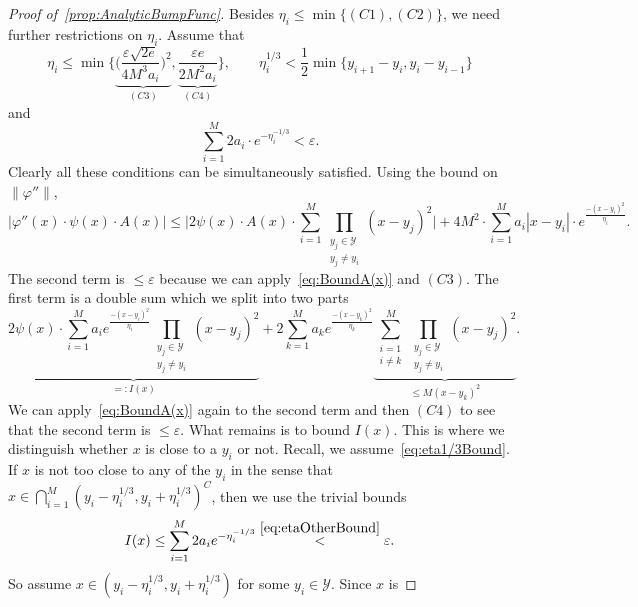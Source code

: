 \documentclass[12pt,]{article}
\def\cref#1{\ref{#1}}%
\theoremstyle{definition}
\theoremstyle{remark}
\newcommand{\0}{\mathbf{0}}
\begin{document}
{\begin{proof}[Proof of~\cref{prop:AnalyticBumpFunc}]
Besides $\eta_i\leq\min\{(C1),(C2)\}$, we need further restrictions on $\eta_i$. Assume that
\begin{equation}\label{eq:eta1/3Bound}
	\eta_i\leq \min \bigg\{ \underbrace{ \Big( \frac{\varepsilon\sqrt{2e}}{4M^3a_i} \Big)^2
	}_{(C3)}, \underbrace{ \frac{\varepsilon e}{2M^2a_i} }_{(C4)} \bigg\},\qquad
	\eta_i^{1/3} < \frac{1}{2} \min\big\{ y_{i+1}-y_i, y_i-y_{i-1} \big\} 
\end{equation}
and
\begin{equation}\label{eq:etaOtherBound}
	\sum_{i=1}^M 2a_i\cdot e^{-\eta_i^{-1/3}} < \varepsilon.
\end{equation}
Clearly all these conditions can be simultaneously satisfied. Using the bound on $\|\varphi''\|$,
\begin{equation*}
	\big|\varphi''(x)\cdot \psi(x)\cdot A(x)\big|\leq  \bigg| 2\psi(x)\cdot A(x)\cdot
	\sum_{i=1}^{M}  \prod_{\substack{y_j\in\mathcal{Y}\\ y_j\neq y_i}} (x-y_j)^2 \bigg| +
	4M^2\cdot \sum_{i=1}^{M} a_i|x-y_i| \cdot e^{\frac{-(x-y_i)^2}{\eta_i}}.
\end{equation*}
The second term is $\leq \varepsilon$ because we can apply~\cref{eq:BoundA(x)} and $(C3)$. The first
term is a double sum which we split into two parts
\begin{equation*}
	\underbrace{2\psi(x)\cdot  \sum_{i=1}^{M} a_i e^{\frac{-(x-y_i)^2}{\eta_i}}
	\prod_{\substack{y_j\in\mathcal{Y}\\ y_j\neq y_i}} (x-y_j)^2}_{=: I(x)} +
	2 \sum_{k=1}^{M}  a_k  e^{\frac{-(x-y_k)^2}{\eta_k}} \underbrace{\sum_{\substack{i=1 \\
	i\neq k}}^{M} \prod_{\substack{y_j\in\mathcal{Y}\\ y_j\neq y_i}} (x-y_j)^2}_{\leq
      M(x-y_k)^2}.
\end{equation*} 
We can apply~\cref{eq:BoundA(x)} again to the second term and then $(C4)$ to see that the second
term is $\leq \varepsilon$. What remains is to bound $I(x)$. This is where we distinguish whether
$x$ is close to a $y_i$ or not. Recall, we assume~\cref{eq:eta1/3Bound}. If $x$ is not too close to
any of the $y_i$ in the sense that $x\in\bigcap_{i=1}^M (y_i-\eta_i^{1/3}, y_i+\eta_i^{1/3})^C$,
then we use the trivial bounds
\begin{equation*}
	I(x) \leq \sum_{i=1}^{M} 2a_ie^{-\eta_i^{-1/3}} \stackrel{\eqref{eq:etaOtherBound}}{<} \varepsilon.
\end{equation*}
So assume $x\in(y_i-\eta_i^{1/3}, y_i+\eta_i^{1/3})$ for some $y_i\in\mathcal{Y}$. Since $x$ is

\end{proof}}
\end{document}
